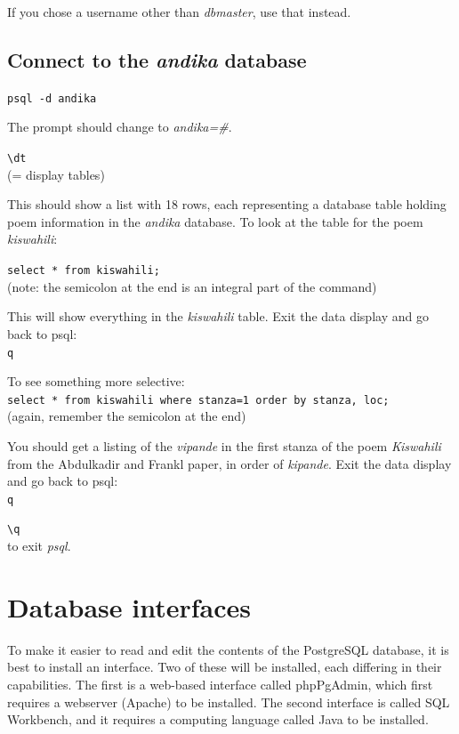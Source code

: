 If you chose a username other than \textit{dbmaster}, use that instead.


\subsection{Connect to the \textit{andika} database}
\label{ss:connect}

\verb|psql -d andika|

The prompt should change to \textit{andika=\#}. 

\verb|\dt|\\
(= display tables)

This should show a list with 18 rows, each representing a database table holding poem information in the \textit{andika} database.  To look at the table for the poem \textit{kiswahili}:

\verb|select * from kiswahili;|\\
(note: the semicolon at the end is an integral part of the command)

This will show everything in the \textit{kiswahili} table.  Exit the data display and go back to psql:\\
\verb|q|

To see something more selective:\\
\verb|select * from kiswahili where stanza=1 order by stanza, loc;|\\
(again, remember the semicolon at the end)

You should get a listing of the \textit{vipande} in the first stanza of the poem \textit{Kiswahili} from the Abdulkadir and Frankl paper, in order of \textit{kipande}.  Exit the data display and go back to psql:\\
\verb|q|

\verb|\q|\\
to exit \textit{psql}.


\section{Database interfaces}

To make it easier to read and edit the contents of the PostgreSQL database, it is best to install an interface.  Two of these will be installed, each differing in their capabilities.  The first is a web-based interface called phpPgAdmin, which first requires a webserver (Apache) to be installed.  The second interface is called SQL Workbench, and it requires a computing language called Java to be installed.

